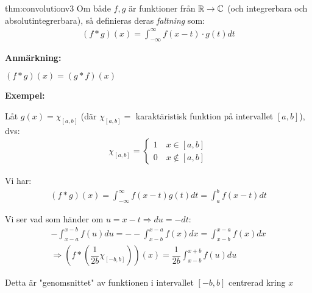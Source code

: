 \begin{theo}{thm:convolutionv3}
  Om både $f,g$ är funktioner från $\mathbb{R}\to\mathbb{C}$ (och integrerbara och absolutintegrerbara), så definieras deras \textit{faltning} som:
  \begin{equation*}
    \begin{gathered}
      (f*g)(x) = \int_{-\infty}^{\infty}f(x-t)\cdot g(t)dt
    \end{gathered}
  \end{equation*}
\end{theo}
\par\bigskip
\noindent\textbf{Anmärkning:}\par
\noindent $(f*g)(x) = (g*f)(x)$
\par\bigskip
\noindent\textbf{Exempel:}\par
\noindent Låt $g(x) = \chi_{[a,b]}$ (där $\chi_{[a,b]} =$ karaktäristisk funktion på intervallet $[a,b]$), dvs:
\begin{equation*}
  \begin{gathered}
    \chi_{[a,b]} = \begin{cases}1\quad x\in[a,b]\\0\quad x\not\in[a,b]\end{cases}
  \end{gathered}
\end{equation*}
\par\bigskip
\noindent Vi har:
\begin{equation*}
  \begin{gathered}
    (f*g)(x) = \int_{-\infty}^{\infty}f(x-t)g(t)dt = \int_{a}^{b}f(x-t)dt
  \end{gathered}
\end{equation*}
\par\bigskip
\noindent Vi ser vad som händer om $u = x-t\Rightarrow du = -dt$:
\begin{equation*}
  \begin{gathered}
    -\int_{x-a}^{x-b}f(u)du = --\int_{x-b}^{x-a}f(x)dx = \int_{x-b}^{x-a}f(x)dx\\
    \Rightarrow (f*(\dfrac{1}{2b}\chi_{[-b,b]}))(x) = \dfrac{1}{2b}\int_{x-b}^{x+b}f(u)du
  \end{gathered}
\end{equation*}
\par\bigskip
\noindent Detta är "genomsnittet" av funktionen i intervallet $[-b,b]$ centrerad kring $x$
\par\bigskip

